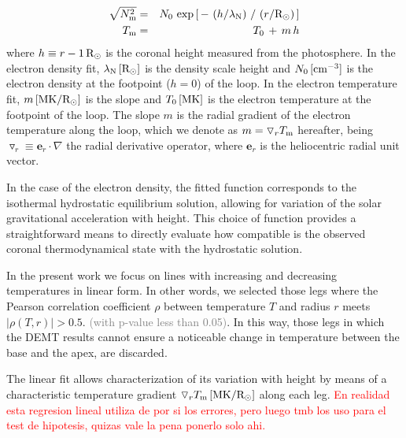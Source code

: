 \documentclass[namedreferences]{solarphysics}
\renewcommand{\l}{\lambda_{\rm N}}%
\newcommand{\mrsun}{{\rm R_\odot}}
\newcommand{\MK}{{\rm MK}}
\newcommand{\cm}{{\rm cm}}
\newcommand{\cminvc}{\cm^{-3}}
\newcommand{\dr}{\triangledown_r}
\newcommand{\er}{\mathbf{e}_r}
\newcommand{\Tm}{T_{\rm m}}
\newcommand{\Nsqm}{N^2_{{\rm m}}}
\newcommand{\rhoTr}{\rho(T,r)}
\newcommand{\sqravgN}{\sqrt{\Nsqm}}
\def\diego#1{\textcolor{red}{#1}}
\def\temp#1{\textcolor{gray}{#1}}
\begin{document}
\begin{article}
\begin{eqnarray}\label{Nfit}
\sqravgN &=& N_0\,\exp{\left[\,-\,\left(h/\l\right)\,/\,\left(r/\mrsun\right)\,\right]}\\
\label{Tfit}
\Tm &=& T_0\,+\,m\,h
\end{eqnarray}
\noindent
where $h \equiv r - 1\,\mrsun$ is the coronal height measured from the photosphere. In the electron density fit, $\l\,[\mrsun]$ is the density scale height and $N_0\,[\cminvc]$ is the electron density at the footpoint ($h=0$) of the loop. In the electron temperature fit, $m\,[\MK/\mrsun]$ is the slope and $T_0\,[\MK]$ is the electron temperature at the footpoint of the loop. The slope $m$ is the radial gradient of the electron temperature along the loop, which we denote as $m = \dr\Tm$ hereafter, being $\dr\equiv\er\cdot\nabla$ the radial derivative operator, where $\er$ is the heliocentric radial unit vector.

In the case of the electron density, the fitted function corresponds to the isothermal hydrostatic equilibrium solution, allowing for variation of the solar gravitational acceleration with height. This choice of function provides a straightforward means to directly evaluate how compatible is the observed coronal thermodynamical state with the hydrostatic solution.



In the present work we focus on lines with increasing and decreasing temperatures in linear form. In other words, we selected those legs where the {Pearson correlation coefficient $\rho$ between temperature $T$ and radius $r$ meets $|\rhoTr| > 0.5$}. \temp{(with p-value less than 0.05)}. In this way, those legs in which the DEMT results cannot ensure a noticeable change in temperature between the base and the apex, are discarded.


The linear fit allows characterization of its variation with height by means of a characteristic temperature gradient $\dr \Tm\,[\MK/\mrsun]$ along each leg.
\diego{En realidad esta regresion lineal utiliza de por si los errores, pero luego tmb los uso para el test de hipotesis, quizas vale la pena ponerlo solo ahi.}



\end{article}
\end{document}
